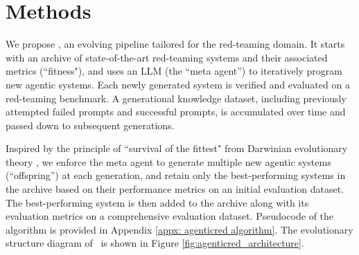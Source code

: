 \vspace{-0.2cm}
\section{Methods}
\label{method}

\vspace{-0.2cm}

We propose \method, an evolving pipeline tailored for the red-teaming domain. It starts with an archive of state-of-the-art red-teaming systems and their associated metrics (``fitness"), and uses an LLM (the ``meta agent'') to iteratively program new agentic systems. Each newly generated system is verified and evaluated on a red-teaming benchmark. A generational knowledge dataset, including previously attempted failed prompts and successful prompts, is accumulated over time and passed down to subsequent generations.

Inspired by the principle of ``survival of the fittest" from Darwinian evolutionary theory \citep{darwin2023origin}, we enforce the meta agent to generate multiple new agentic systems (``offspring'') at each generation, and retain only the best-performing systems in the archive based on their performance metrics on an initial evaluation dataset. The best-performing system is then added to the archive along with its evaluation metrics on a comprehensive evaluation dataset. Pseudocode of the algorithm is provided in Appendix \ref{appx: agenticred algorithm}. The evolutionary structure diagram of \method~is shown in Figure \ref{fig:agenticred_architecture}. 


